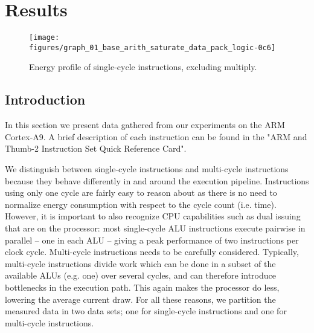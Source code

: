 \section{Results}

%
%
%
%

\begin{figure*}[ht]
    \centering
    \texttt{[image: figures/graph\_01\_base\_arith\_saturate\_data\_pack\_logic-0c6]}
    \caption{Energy profile of single-cycle instructions, excluding multiply.}
    \label{fig:singlecycle}
\end{figure*}



\subsection{Introduction}
In this section we present data gathered from our experiments on the ARM
Cortex-A9. A brief description of each instruction can be found in the "ARM and
Thumb-2 Instruction Set Quick Reference Card"\cite{armasmref}.

We distinguish between single-cycle instructions and multi-cycle instructions
because they behave differently in and around the execution pipeline.
Instructions using only one cycle are fairly easy to reason about as there is no
need to normalize energy consumption with respect to the cycle count (i.e.
time). However, it is important to also recognize CPU capabilities such as dual
issuing that are on the processor: most single-cycle ALU instructions execute
pairwise in parallel -- one in each ALU -- giving a peak performance of two
instructions per clock cycle. Multi-cycle instructions needs to be carefully
considered. Typically, multi-cycle instructions divide work which can be done
in a subset of the available ALUs (e.g. one) over several cycles, and can
therefore introduce bottlenecks in the execution path. This again makes the
processor do less, lowering the average current draw. For all these reasons, we
partition the measured data in two data sets; one for single-cycle instructions
and one for multi-cycle instructions.

